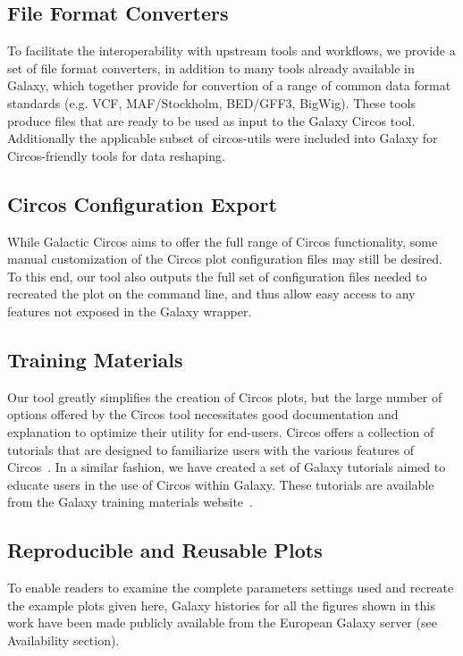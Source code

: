 \subsection*{File Format Converters}
To facilitate the interoperability with upstream tools and workflows, we provide a set of file format converters, in addition to many tools already available in Galaxy, which together provide for convertion of a range of common data format standards (e.g. VCF, MAF/Stockholm, BED/GFF3, BigWig). These tools produce files that are ready to be used as input to the Galaxy Circos tool. Additionally the applicable subset of circos-utils were included into Galaxy for Circos-friendly tools for data reshaping.

\subsection*{Circos Configuration Export}
While Galactic Circos aims to offer the full range of Circos functionality, some manual customization of the Circos plot configuration files may still be desired. To this end, our tool also outputs the full set of configuration files needed to recreated the plot on the command line, and thus allow easy access to any features not exposed in the Galaxy wrapper.

\subsection*{Training Materials}
Our tool greatly simplifies the creation of Circos plots, but the large number of options offered by the Circos tool necessitates good documentation and explanation to optimize their utility for end-users. Circos offers a collection of tutorials that are designed to familiarize users with the various features of Circos~\cite{circostutorials}. In a similar fashion, we have created a set of Galaxy tutorials aimed to educate users in the use of Circos within Galaxy. These tutorials are available from the Galaxy training materials website~\cite{Batut2018}.

\subsection*{Reproducible and Reusable Plots}
To enable readers to examine the complete parameters settings used and recreate the example plots given here, Galaxy histories for all the figures shown in this work have been made publicly available from the European Galaxy server (see Availability section).

